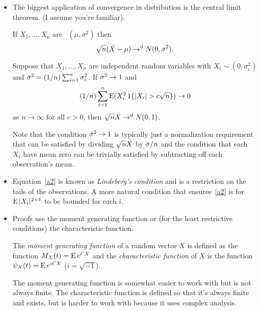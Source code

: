 \begin{itemize}[leftmargin=0pt]

\item The biggest application of convergence in distribution is the
  central limit theorem.  (I assume you're familiar).

  \begin{thm}
    If $X_1,...,X_n$ are \iid\ $(\mu, \sigma^2)$ then
    \begin{equation*}
      \sqrt{n} (\bar{X} - \mu) \to^d N(0,\sigma^2).
    \end{equation*}
  \end{thm}

  \begin{thm}
    Suppose that $X_1,...,X_n$ are independent random variables with
    $X_i \sim (0, \sigma^2_i)$ and $\bar{\sigma}^2 = (1/n) \sum_{i=1}^n \sigma^2_i$.  If $\bar{\sigma}^2 \to 1$
    and
    \begin{equation}\label{a2}
      (1/n) \sum_{i=1}^n \operatorname{E}( X_i^2 \operatorname{1}\{ |X_i| > c \sqrt{n} \} ) \to 0
    \end{equation}
    as $n \to \infty$ for all $c > 0$, then $\sqrt{n} \bar{X} \to^d N(0, 1)$.
  \end{thm}
  Note that the condition $\bar{\sigma}^2 \to 1$ is typically just a normalization
  requirement that can be satisfied by dividing $\sqrt{n} \bar{X}$ by
  $\bar{\sigma}/n$ and the condition that each $X_i$ have mean zero can be
  trivially satisfied by subtracting off each observation's mean.

\item Equation~\eqref{a2} is known as \emph{Lindeberg's condition}
  and is a restriction on the tails of the observations.  A more
  natural condition that ensures~\eqref{a2} is for $\operatorname{E} |X_i|^{2 +
  \delta}$ to be bounded for each $i$.

\item Proofs use the moment generating function or (for the least
  restrictive conditions) the characteristic function.

  \begin{defn}
    The \emph{moment generating function} of a random vector $X$ is
    defined as the function $M_X(t) = \operatorname{E} e^{t'X}$ and the
    \emph{characteristic function} of $X$ is the function $\psi_X(t) = \operatorname{E}
    e^{it'X}$ ($i = \sqrt{-1}$).
  \end{defn}

  The moment generating function is somewhat easier to work with but is
  not always finite.  The characteristic function is defined so that
  it's always finite and exists, but is harder to work with because it
  uses complex analysis.


\end{itemize}
